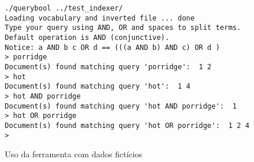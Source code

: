 \documentclass[10pt,twocolumn]{article}
\begin{document}
\begin{figure*}
\begin{center}
\begin{verbatim}
./querybool ../test_indexer/
Loading vocabulary and inverted file ... done
Type your query using AND, OR and spaces to split terms.
Default operation is AND (conjunctive).
Notice: a AND b c OR d == (((a AND b) AND c) OR d )
> porridge
Document(s) found matching query 'porridge':  1 2
> hot
Document(s) found matching query 'hot':  1 4
> hot AND porridge
Document(s) found matching query 'hot AND porridge':  1
> hot OR porridge
Document(s) found matching query 'hot OR porridge':  1 2 4
>
\end{verbatim}
\caption{Uso da ferramenta com dados fictícios}
\end{center}
\end{figure*}
\end{document}
